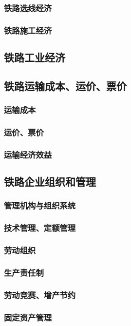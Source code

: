 \documentclass[UTF8]{../../RepresentationUniverse}
\begin{document}
        \subsubsection{铁路选线经济}
        \subsubsection{铁路施工经济}
    \subsection{铁路工业经济}
    \subsection{铁路运输成本、运价、票价}
        \subsubsection{运输成本}
        \subsubsection{运价、票价}
        \subsubsection{运输经济效益}
    \subsection{铁路企业组织和管理}
        \subsubsection{管理机构与组织系统}
        \subsubsection{技术管理、定额管理}
        \subsubsection{劳动组织}
        \subsubsection{生产责任制}
        \subsubsection{劳动竞赛、增产节约}
        \subsubsection{固定资产管理}
\end{document}
